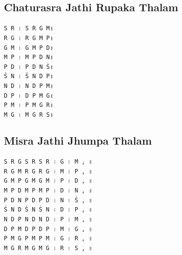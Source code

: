 \documentclass[12pt]{article}
\newcommand{\df}[1]{{\devanagarifont#1}}
\begin{document}
\subsection{Chaturasra Jathi Rupaka Thalam}
\texttt{S~R~\df{।}~S~R~G~M\df{॥}}\\
\texttt{R~G~\df{।}~R~G~M~P\df{॥}}\\
\texttt{G~M~\df{।}~G~M~P~D\df{॥}}\\
\texttt{M~P~\df{।}~M~P~D~N\df{॥}}\\
\texttt{P~D~\df{।}~P~D~N~Ṡ\df{॥}}\\
\texttt{Ṡ~N~\df{।}~Ṡ~N~D~P\df{॥}}\\
\texttt{N~D~\df{।}~N~D~P~M\df{॥}}\\
\texttt{D~P~\df{।}~D~P~M~G\df{॥}}\\
\texttt{P~M~\df{।}~P~M~G~R\df{॥}}\\
\texttt{M~G~\df{।}~M~G~R~S\df{॥}}\\
\newpage
\subsection{Misra Jathi Jhumpa Thalam}
\texttt{S~R~G~\hspace{0.5em}S~R~\hspace{0.5em}S~R~\df{।}~G~\df{।}~M~\df{,}~\df{॥}}\\
\texttt{R~G~M~\hspace{0.5em}R~G~\hspace{0.5em}R~G~\df{।}~M~\df{।}~P~\df{,}~\df{॥}}\\
\texttt{G~M~P~\hspace{0.5em}G~M~\hspace{0.5em}G~M~\df{।}~P~\df{।}~D~\df{,}~\df{॥}}\\
\texttt{M~P~D~\hspace{0.5em}M~P~\hspace{0.5em}M~P~\df{।}~D~\df{।}~N~\df{,}~\df{॥}}\\
\texttt{P~D~N~\hspace{0.5em}P~D~\hspace{0.5em}P~D~\df{।}~N~\df{।}~Ṡ~\df{,}~\df{॥}}\\
\texttt{Ṡ~N~D~\hspace{0.5em}Ṡ~N~\hspace{0.5em}Ṡ~N~\df{।}~D~\df{।}~P~\df{,}~\df{॥}}\\
\texttt{N~D~P~\hspace{0.5em}N~D~\hspace{0.5em}N~D~\df{।}~P~\df{।}~M~\df{,}~\df{॥}}\\
\texttt{D~P~M~\hspace{0.5em}D~P~\hspace{0.5em}D~P~\df{।}~M~\df{।}~G~\df{,}~\df{॥}}\\
\texttt{P~M~G~\hspace{0.5em}P~M~\hspace{0.5em}P~M~\df{।}~G~\df{।}~R~\df{,}~\df{॥}}\\
\texttt{M~G~R~\hspace{0.5em}M~G~\hspace{0.5em}M~G~\df{।}~R~\df{।}~S~\df{,}~\df{॥}}\\
\end{document}
